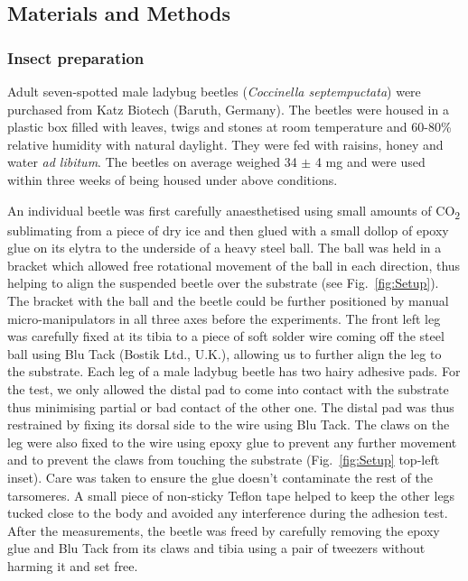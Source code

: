 \documentclass[vruler,JEB]{COB}%
\begin{document}
\subsection{Materials and Methods}

\subsubsection{Insect preparation}

Adult seven-spotted male ladybug beetles (\emph{Coccinella septempuctata})
were purchased from Katz Biotech (Baruth, Germany). The beetles were housed in a plastic box filled with leaves,
twigs and stones at room temperature and 60-80\% relative humidity
with natural daylight. They were fed with raisins, honey and
water \emph{ad libitum}. The beetles on average weighed 34 $\pm$ 4 mg and were used within three weeks of being housed under above conditions.

An individual beetle was first carefully anaesthetised using small amounts of CO\textsubscript{2} sublimating
from a piece of dry ice and then glued with a small dollop of epoxy glue on its elytra to the underside of a heavy steel ball. The ball was held in a bracket which allowed free rotational movement of the ball in each direction, thus helping to align the suspended beetle over the substrate (see Fig.~\ref{fig:Setup}). The bracket with the ball and the beetle could be further positioned by manual micro-manipulators in all three axes before the experiments. The front left leg was carefully fixed at its tibia to a piece of soft solder wire coming off the steel ball using Blu Tack (Bostik Ltd., U.K.), allowing us to further align the leg to the substrate. Each leg of a male ladybug beetle has two hairy adhesive pads. For the test, we only allowed the distal pad to come into contact with the substrate thus minimising partial or bad contact of the other one. The distal pad was thus restrained by fixing its dorsal side to the wire using Blu Tack. The claws on the leg were also fixed to the wire using epoxy glue to prevent any further movement and to prevent the claws from touching the substrate (Fig.~\ref{fig:Setup} top-left inset). Care was taken to ensure the glue doesn't contaminate the rest of the tarsomeres. A small piece of non-sticky Teflon tape helped to keep the other legs tucked close to the body and avoided any interference during the adhesion test. After the measurements, the beetle was freed by carefully removing the epoxy glue and Blu Tack from its claws and tibia using a pair of tweezers without harming it and set free. 
\end{document}
